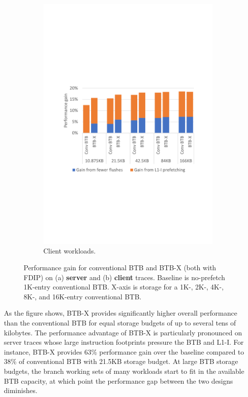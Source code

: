 \begin{figure}
    ~ %
    \begin{subfigure}[t]{0.8\columnwidth}
        \centering
        \includegraphics[width=\columnwidth, trim=70 230 60 230, clip]{figures/clientRes3.pdf}
        \caption{Client workloads.}
        \label{fig:clientPerf}
    \end{subfigure}
    \caption{Performance gain for conventional BTB and BTB-X (both with FDIP) on (a) \textbf{server} and (b) \textbf{client} traces. Baseline is no-prefetch 1K-entry conventional BTB. X-axis is storage for a 1K-, 2K-, 4K-, 8K-, and 16K-entry conventional BTB.}
    \label{fig:perf}
\end{figure}

As the figure shows, BTB-X provides significantly higher overall performance than the conventional BTB for equal storage budgets of up to several tens of kilobytes. The performance advantage of BTB-X is particularly pronounced on server traces whose large instruction footprints pressure the BTB and L1-I. For instance, BTB-X provides 63\% performance gain over the baseline compared to 38\% of conventional BTB with 21.5KB storage budget.
At large BTB storage budgets, the branch working sets of many workloads start to fit in the available BTB capacity, at which point the performance gap between the two designs diminishes.

